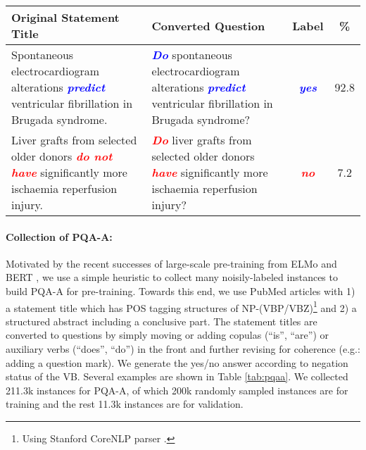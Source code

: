 \documentclass[11pt,a4paper]{article}
\begin{document}
\begin{table*}[!t]
\centering
\small
\begin{tabular}{p{6.5cm}p{6.5cm}cc}
\toprule
\textbf{Original Statement Title} & \textbf{Converted Question} & \textbf{Label} & \textbf{\%}\\
\midrule
Spontaneous electrocardiogram alterations \textit{\textbf{\textcolor{blue}{predict}}} ventricular fibrillation in Brugada syndrome. & \textit{\textbf{\textcolor{blue}{Do}}} spontaneous electrocardiogram alterations \textit{\textbf{\textcolor{blue}{predict}}} ventricular fibrillation in Brugada syndrome? & \textit{\textbf{\textcolor{blue}{yes}}} & 92.8 \\
\midrule
Liver grafts from selected older donors \textit{\textbf{\textcolor{red}{do not have}}} significantly more ischaemia reperfusion injury. & \textit{\textbf{\textcolor{red}{Do}}} liver grafts from selected older donors \textit{\textbf{\textcolor{red}{have}}} significantly more ischaemia reperfusion injury? & \textit{\textbf{\textcolor{red}{no}}} & 7.2 \\
\bottomrule
\end{tabular}
\caption{Examples of automatically generated instances for PQA-A. Original statement titles are converted to questions and answers are automatically generated according to the negation status.}
\label{tab:pqaa}
\vspace{-0.5em}
\end{table*}

\paragraph{Collection of PQA-A:} Motivated by the recent successes of large-scale pre-training from ELMo \cite{peters2018deep} and BERT \cite{devlin2018bert}, we use a simple heuristic to collect many noisily-labeled instances to build PQA-A for pre-training. Towards this end, we use PubMed articles with 1) a statement title which has POS tagging structures of NP-(VBP/VBZ)\footnote{Using Stanford CoreNLP parser \cite{manning-EtAl:2014:P14-5}.} and 2) a structured abstract including a conclusive part. The statement titles are converted to questions by simply moving or adding copulas (``is'', ``are'') or auxiliary verbs (``does'', ``do'') in the front and further revising for coherence (e.g.: adding a question mark). We generate the yes/no answer according to negation status of the VB. Several examples are shown in Table \ref{tab:pqaa}. We collected 211.3k instances for PQA-A, of which 200k randomly sampled instances are for training and the rest 11.3k instances are for validation.
\end{document}
